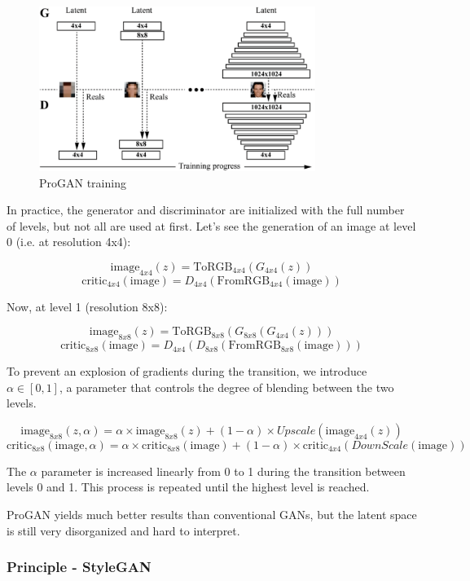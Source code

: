 \documentclass{article}
\begin{document}
\begin{figure}[H]
    \centering
    \includegraphics[width=0.8\textwidth]{images/progan.png}
    \caption{ProGAN training}
\end{figure}

In practice, the generator and discriminator are initialized with the full number of levels, but not all are used at first. Let's see the generation of an image at level 0 (i.e. at resolution 4x4):

\[\text{image}_{4x4}(z) = \text{ToRGB}_{4x4}(G_{4x4}(z))\]
\[\text{critic}_{4x4}(\text{image}) = D_{4x4}(\text{FromRGB}_{4x4}(\text{image}))\]

Now, at level 1 (resolution 8x8):

\[\text{image}_{8x8}(z) = \text{ToRGB}_{8x8}(G_{8x8}(G_{4x4}(z)))\]
\[\text{critic}_{8x8}(\text{image}) = D_{4x4}(D_{8x8}(\text{FromRGB}_{8x8}(\text{image})))\]

To prevent an explosion of gradients during the transition, we introduce $\alpha \in \left[0, 1\right]$, a parameter that controls the degree of blending between the two levels.

\[\text{image}_{8x8}(z, \alpha) = \alpha \times \text{image}_{8x8}(z) + (1-\alpha) \times Upscale(\text{image}_{4x4}(z))\]
\[\text{critic}_{8x8}(\text{image}, \alpha) = \alpha \times \text{critic}_{8x8}(\text{image}) + (1-\alpha) \times \text{critic}_{4x4}(DownScale(\text{image}))\]

The $\alpha$ parameter is increased linearly from 0 to 1 during the transition between levels 0 and 1. This process is repeated until the highest level is reached. 

ProGAN yields much better results than conventional GANs, but the latent space is still very disorganized and hard to interpret.

\subsubsection*{Principle - StyleGAN}
\end{document}

